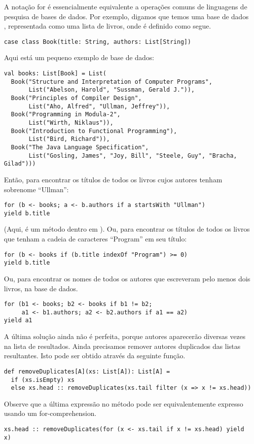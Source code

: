 A notação for é essencialmente equivalente a operações comuns de linguagens de pesquisa de bases de dados.
Por exemplo, digamos que temos uma base de dados , representada como uma lista de livros, onde
 é definido como segue.
\begin{lstlisting}
case class Book(title: String, authors: List[String])
\end{lstlisting}
Aqui está um pequeno exemplo de base de dados:
\begin{lstlisting}
val books: List[Book] = List(
  Book("Structure and Interpretation of Computer Programs",
       List("Abelson, Harold", "Sussman, Gerald J.")),
  Book("Principles of Compiler Design",
       List("Aho, Alfred", "Ullman, Jeffrey")),
  Book("Programming in Modula-2",
       List("Wirth, Niklaus")),
  Book("Introduction to Functional Programming"),
       List("Bird, Richard")),
  Book("The Java Language Specification",
       List("Gosling, James", "Joy, Bill", "Steele, Guy", "Bracha, Gilad")))
\end{lstlisting}
Então, para encontrar os títulos de todos os livros cujos autores tenham sobrenome ``Ullman'':
\begin{lstlisting}
for (b <- books; a <- b.authors if a startsWith "Ullman")
yield b.title
\end{lstlisting}
(Aqui,  é um método dentro em ).  Ou, para encontrar os 
títulos de todos os livros que tenham a cadeia de caracteres ``Program'' em seu título: 
\begin{lstlisting}
for (b <- books if (b.title indexOf "Program") >= 0)
yield b.title
\end{lstlisting}
Ou, para encontrar os nomes de todos os autores que escreveram pelo menos dois livros, na base de dados.
\begin{lstlisting}
for (b1 <- books; b2 <- books if b1 != b2;
     a1 <- b1.authors; a2 <- b2.authors if a1 == a2)
yield a1
\end{lstlisting}
A última solução ainda não é perfeita, porque autores aparecerão diversas vezes na lista de resultados.
Ainda precisamos remover autores duplicados das listas resultantes. Isto pode ser obtido através da seguinte 
função.
\begin{lstlisting}
def removeDuplicates[A](xs: List[A]): List[A] =
  if (xs.isEmpty) xs
  else xs.head :: removeDuplicates(xs.tail filter (x => x != xs.head))
\end{lstlisting}
Observe que a última expressão no método  pode ser equivalentemente expresso usando 
um for-comprehension.
\begin{lstlisting}
xs.head :: removeDuplicates(for (x <- xs.tail if x != xs.head) yield x)
\end{lstlisting}

